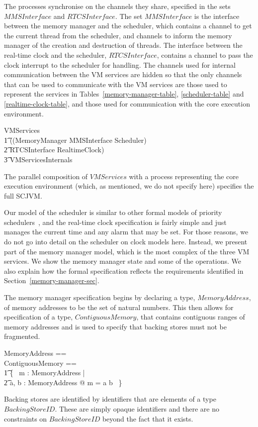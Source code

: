\documentclass[a4paper,10pt]{article}
\begin{document}
The processes synchronise on the channels they share, specified in the
sets $MMSInterface$ and $RTCSInterface$. The set $MMSInterface$ is the interface
between the memory manager and the scheduler, which contains a channel to get
the current thread from the scheduler, and channels to inform the memory manager
of the creation and destruction of threads. The interface between the real-time
clock and the scheduler, $RTCSInterface$, contains a channel to pass the clock
interrupt to the scheduler for handling. The channels used for internal
communication between the VM services are hidden so that the only channels that
can be used to communicate with the VM services are those used to represent the
services in Tables~\ref{memory-manager-table}, \ref{scheduler-table} and
\ref{realtime-clock-table}, and those used for communication with the core
execution environment.
%
\begin{circus}
  VMServices \circdef \\
  \t1 ((MemoryManager \lpar MMSInterface \rpar Scheduler) \\
  \t2 \lpar RTCSInterface \rpar RealtimeClock) \\
  \t3 \circhide VMServicesInternals
\end{circus}
%
The parallel composition of $VMServices$ with a process representing the core
execution environment (which, as mentioned, we do not specify here)
specifies the full SCJVM.

Our model of the scheduler is similar to other formal models of priority
schedulers~\cite{ferreira2014, gotsman2013, klein2014, lime2009}, and the
real-time clock specification is fairly simple and just manages the current time
and any alarm that may be set. For those reasons, we do not go into detail on
the scheduler on clock models here. Instead, we present part of the memory
manager model, which is the most complex of the three VM services.  We show the
memory manager state and some of the operations. We also explain how the formal
specification reflects the requirements identified in
Section~\ref{memory-manager-sec}.

The memory manager specification begins by declaring a type, $MemoryAddress$, of
memory addresses to be the set of natural numbers.  This then allows for
specification of a type, $ContiguousMemory$, that contains contiguous ranges of
memory addresses and is used to specify that backing stores must not be
fragmented.
%
\begin{zed}
	MemoryAddress == \nat \\
	ContiguousMemory == \\
        \t1 \{~ m : \power MemoryAddress | \\
        \t2 \exists a, b : MemoryAddress @ m = a \upto b ~\}
\end{zed}
%
Backing stores are identified by identifiers that are elements of a type
$BackingStoreID$. These are simply opaque identifiers and there are no
constraints on $BackingStoreID$ beyond the fact that it exists.
\end{document}
